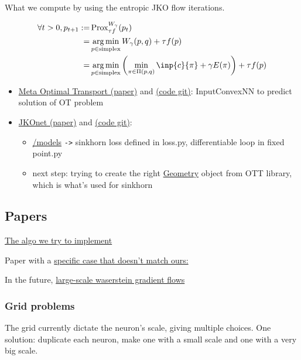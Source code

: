 What we compute by using the entropic JKO flow iterations.

\begin{align}
	\forall t > 0, p_{t+1} := & \prox^{W_{\gamma}}_{\tau f}(p_t) \\
							= & \argmin_{p \in \text{simplex}} W_{\gamma}(p, q) + \tau f(p) \\
							= &\argmin_{p \in \text{simplex}}  \left( \min_{\pi \in \Pi(p, q)} \inp{c}{\pi} + \gamma E(\pi) \right) + \tau f(p)
\end{align}


\begin{itemize}
	\item \href{https://arxiv.org/pdf/2206.05262.pdf}{Meta Optimal Transport (paper)} and \href{https://github.com/facebookresearch/meta-ot}{(code git)}: InputConvexNN to predict solution of OT problem
	\item \href{https://arxiv.org/pdf/2106.06345.pdf}{JKOnet (paper)} and \href{https://github.com/bunnech/jkonet}{(code git)}:
		\begin{itemize}
			\item \href{https://github.com/bunnech/jkonet/tree/main/jkonet/models}{/models} \verb|->| sinkhorn loss defined in loss.py, differentiable loop in fixed point.py
			\item next step: trying to create the right \href{https://ott-jax.readthedocs.io/en/latest/_autosummary/ott.geometry.geometry.Geometry.html#ott.geometry.geometry.Geometry}{Geometry} object from OTT library, which is what's used for sinkhorn
		\end{itemize}
\end{itemize}

\subsection{Papers}

\href{https://arxiv.org/pdf/1502.06216.pdf}{The algo we try to implement}

Paper with a \href{https://arxiv.org/pdf/1512.02783.pdf}{specific case that doesn't match ours:} 

In the future, \href{https://arxiv.org/pdf/2106.00736.pdf}{large-scale waserstein gradient flows}

\subsubsection{Grid problems}

The grid currently dictate the neuron's scale, giving multiple choices. One solution: duplicate each neuron, make one with a small scale and one with a very big scale.
